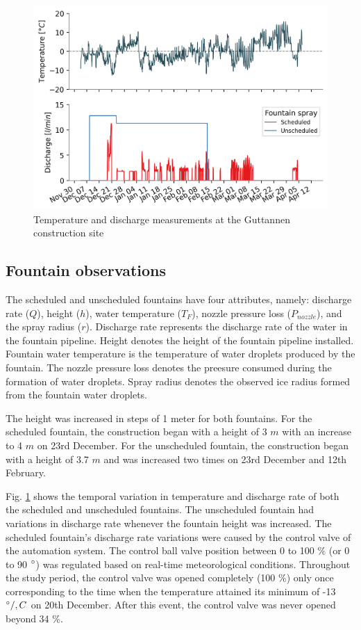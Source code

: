 \documentclass[tc, manuscript]{copernicus}
\begin{document}
\begin{figure}[htb]
\includegraphics[width=12cm]{Figures/disvstemp.png}
\caption{Temperature and discharge measurements at the Guttannen construction site}
\label{fig:aws} 
\end{figure}

\subsection{Fountain observations}

The scheduled and unscheduled fountains have four attributes, namely: discharge rate ($Q$), height ($h$), water
temperature ($T_F$), nozzle pressure loss ($P_{nozzle}$), and the spray radius ($r$). Discharge rate represents
the discharge rate of the water in the fountain pipeline. Height denotes the height of the fountain pipeline
installed. Fountain water temperature is the temperature of water droplets produced by the fountain. The nozzle
pressure loss denotes the preesure consumed during the formation of water droplets. Spray radius denotes the
observed ice radius formed from the fountain water droplets.

The height was increased in steps of 1 meter for both fountains. For the scheduled fountain, the
construction began with a height of 3 $m$ with an increase to 4 $m$ on 23rd December. For the unscheduled
fountain, the construction began with a height of 3.7 $m$ and was increased two times on 23rd December
and 12th February.

Fig. \ref{fig:aws} shows the temporal variation in temperature and discharge rate of both the scheduled and
unscheduled fountains. The unscheduled fountain had variations in discharge rate whenever the fountain height
was increased. The scheduled fountain's discharge rate variations were caused by the control valve of the
automation system. The control ball valve position between 0 to 100 \% (or 0 to 90 $^{\circ}$) was regulated
based on real-time meteorological conditions. Throughout the study period, the control valve was opened
completely (100 \%) only once corresponding to the time when the temperature attained its minimum of -13
$^{\circ}/,C$ on 20th December. After this event, the control valve was never opened beyond 34 \%.  
\end{document}
